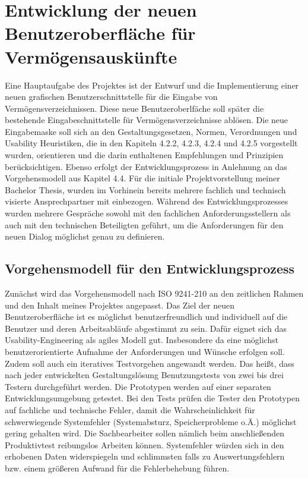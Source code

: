 \section{Entwicklung der neuen Benutzeroberfläche für Vermögensauskünfte}
Eine Hauptaufgabe des Projektes ist der Entwurf und die Implementierung einer neuen grafischen Benutzerschnittstelle für die Eingabe von Vermögensverzeichnissen. Diese neue Benutzeroberlfäche soll später die bestehende Eingabeschnittstelle für Vermögensverzeichnisse ablösen. Die neue Eingabemaske soll sich an den Gestaltungsgesetzen, Normen, Verordnungen und Usability Heuristiken, die in den Kapiteln 4.2.2, 4.2.3, 4.2.4 und 4.2.5 vorgestellt wurden, orientieren und die darin enthaltenen Empfehlungen und Prinzipien berücksichtigen. Ebenso erfolgt der Entwicklungsprozess in Anlehnung an das Vorgehensmodell aus Kapitel 4.4. Für die initiale Projektvorstellung meiner Bachelor Thesis, wurden im Vorhinein bereits mehrere fachlich und technisch visierte Ansprechpartner mit einbezogen. Während des Entwicklungsprozesses wurden mehrere Gespräche sowohl mit den fachlichen Anforderungsstellern als auch mit den technischen Beteiligten geführt, um die Anforderungen für den neuen Dialog möglichst genau zu definieren.


\subsection{Vorgehensmodell für den Entwicklungsprozess}

Zunächst wird das Vorgehensmodell nach ISO 9241-210 an den zeitlichen Rahmen und den Inhalt meines Projektes angepasst. Das Ziel der neuen Benutzeroberfläche ist es möglichst benutzerfreundlich und individuell auf die Benutzer und deren Arbeitsabläufe abgestimmt zu sein. Dafür eignet sich das Usability-Engineering als agiles Modell gut. Insbesondere da eine möglichst benutzerorientierte Aufnahme der Anforderungen und Wünsche erfolgen soll. Zudem soll auch ein iteratives Testvorgehen angewandt werden. Das heißt, dass nach jeder entwickelten Gestaltungslösung Benutzungstests von zwei bis drei Testern durchgeführt werden. Die Prototypen werden auf einer separaten Entwicklungsumgebung getestet. Bei den Tests prüfen die Tester den Prototypen auf fachliche und technische Fehler, damit die Wahrscheinlichkeit für schwerwiegende Systemfehler (Systemabsturz, Speicherprobleme o.Ä.) möglichst gering gehalten wird. Die Sachbearbeiter sollen nämlich beim anschließenden Produktivtest reibungslos Arbeiten können. Systemfehler würden sich in den erhobenen Daten widerspiegeln und schlimmsten falls zu Auswertungsfehlern bzw. einem größeren Aufwand für die Fehlerbehebung führen.


